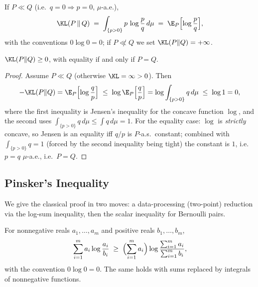 \begin{definition}
\label{def:dd1-kl}
If $P \ll Q$ (i.e.\ $q = 0 \Rightarrow p = 0$, $\mu$-a.e.),
\begin{equation}
\label{eq:dd1-kl-def}
\KL(P \,\|\, Q) \;=\; \int_{\{p > 0\}} p \,\log \frac{p}{q} \, d\mu
\;=\; \E_P\Bigl[ \log \frac{p}{q} \Bigr],
\end{equation}
with the conventions $0 \log 0 = 0$; if $P \not\ll Q$ we set
$\KL(P\|Q) = +\infty$.
\end{definition}

\begin{proposition}
\label{prop:dd1-gibbs}
$\KL(P \| Q) \ge 0$, with equality if and only if $P = Q$.
\end{proposition}

\begin{proof}
Assume $P \ll Q$ (otherwise $\KL = \infty > 0$). Then
\[
-\KL(P\|Q) = \E_P\Bigl[ \log \frac{q}{p} \Bigr]
\;\le\; \log \E_P\Bigl[ \frac{q}{p} \Bigr]
= \log \int_{\{p > 0\}} q \, d\mu
\;\le\; \log 1 = 0,
\]
where the first inequality is Jensen's inequality for the concave function
$\log$, and the second uses $\int_{\{p>0\}} q\, d\mu \le \int q \, d\mu = 1$.
For the equality case: $\log$ is \emph{strictly} concave, so Jensen is an
equality iff $q/p$ is $P$-a.s.\ constant; combined with
$\int_{\{p>0\}} q = 1$ (forced by the second inequality being tight) the
constant is $1$, i.e.\ $p = q$ $\mu$-a.e., i.e.\ $P = Q$.
\end{proof}

\subsection{Pinsker's Inequality}

We give the classical proof \cite{tsybakov2009introduction} in two moves: a
data-processing (two-point) reduction via the log-sum inequality, then the
scalar inequality for Bernoulli pairs.

\begin{lemma}
\label{lem:dd1-logsum}
For nonnegative reals $a_1, \dots, a_m$ and positive reals
$b_1, \dots, b_m$,
\begin{equation}
\label{eq:dd1-logsum}
\sum_{i=1}^m a_i \log \frac{a_i}{b_i}
\;\ge\; \Bigl( \sum_{i=1}^m a_i \Bigr)
\log \frac{\sum_{i=1}^m a_i}{\sum_{i=1}^m b_i},
\end{equation}
with the convention $0 \log 0 = 0$. The same holds with sums replaced by
integrals of nonnegative functions.
\end{lemma}

